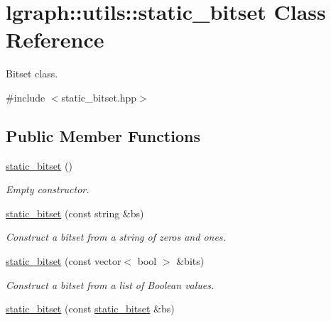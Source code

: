 \hypertarget{classlgraph_1_1utils_1_1static__bitset}{}\section{lgraph\+:\+:utils\+:\+:static\+\_\+bitset Class Reference}
\label{classlgraph_1_1utils_1_1static__bitset}


Bitset class.  




{\ttfamily \#include $<$static\+\_\+bitset.\+hpp$>$}

\subsection*{Public Member Functions}
\begin{DoxyCompactItemize}
\item 
\hyperlink{classlgraph_1_1utils_1_1static__bitset_a6bd7edf22c70684b97eed197bb8fcda5}{static\+\_\+bitset} ()\hypertarget{classlgraph_1_1utils_1_1static__bitset_a6bd7edf22c70684b97eed197bb8fcda5}{}\label{classlgraph_1_1utils_1_1static__bitset_a6bd7edf22c70684b97eed197bb8fcda5}

\begin{DoxyCompactList}\small\item\em Empty constructor. \end{DoxyCompactList}\item 
\hyperlink{classlgraph_1_1utils_1_1static__bitset_afe3f6ba5ee2e9483cd25fe4f263bc798}{static\+\_\+bitset} (const string \&bs)
\begin{DoxyCompactList}\small\item\em Construct a bitset from a string of zeros and ones. \end{DoxyCompactList}\item 
\hyperlink{classlgraph_1_1utils_1_1static__bitset_a6427ac8de435bc7c4dec36373b0b7e65}{static\+\_\+bitset} (const vector$<$ bool $>$ \&bits)
\begin{DoxyCompactList}\small\item\em Construct a bitset from a list of Boolean values. \end{DoxyCompactList}\item 
\hyperlink{classlgraph_1_1utils_1_1static__bitset_a683aec1377830f07c5d5f53f969be569}{static\+\_\+bitset} (const \hyperlink{classlgraph_1_1utils_1_1static__bitset}{static\+\_\+bitset} \&bs)\hypertarget{classlgraph_1_1utils_1_1static__bitset_a683aec1377830f07c5d5f53f969be569}{}\label{classlgraph_1_1utils_1_1static__bitset_a683aec1377830f07c5d5f53f969be569}


\end{DoxyCompactItemize}
